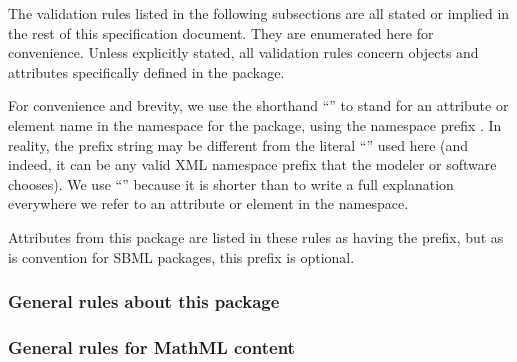 The validation rules listed in the following subsections are all stated
or implied in the rest of this specification document. They are
enumerated here for convenience. Unless explicitly stated, all
validation rules concern objects and attributes specifically defined in
the \DistributionsPackage package.

For \notice convenience and brevity, we use the shorthand
``'' to stand for an attribute or element name
 in the namespace for the \DistributionsPackage package, using
the namespace prefix . In reality, the prefix string may
be different from the literal ``'' used here (and indeed,
it can be any valid XML namespace prefix that the modeler or software
chooses). We use ``'' because it is shorter than to
write a full explanation everywhere we refer to an attribute or element
in the \DistributionsPackage namespace.

Attributes from this package are listed in these rules as having the  prefix, but as is convention for SBML packages, this prefix is optional.

\subsubsection*{General rules about this package}



\subsubsection*{General rules for MathML content}

